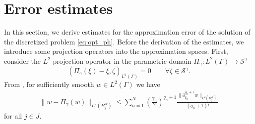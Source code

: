 \documentclass[a4paper,10pt]{article}
\numberwithin{theorem}{section}
\begin{document}


\section{Error estimates}\label{sec:error_estimates} 

In this section, we derive estimates for the approximation error of the solution of the discretized problem  \eqref{eq:opt_ph}. Before the derivation of the estimates,  we introduce some projection operators into the approximation spaces. First, consider the $L^2$-projection operator in the parametric domain  $\Pi_{\gamma}\colon L^2(\Gamma) \rightarrow \mathcal{S}^{\gamma}$  
\begin{equation}
  (\Pi_{\gamma}(\xi) - \xi, \zeta)_{L^2(\Gamma)} = 0  \qquad \forall  \zeta \in \mathcal{S}^{\gamma}.
\end{equation}
From \cite[Equation (3.6)]{IBabuska_RTempone_GEZouraris_2004a}, for sufficiently smooth $w \in L^2(\Gamma)$ we have
\begin{eqnarray}\label{est:parametric}
  \|w - \Pi_\gamma(w)\|_{L^2(B_j^N)} \leq
  \sum_{n=1}^N \left(\frac{\gamma_n}{2}\right)^{q_n+1} \frac{\|\partial_{\xi_n}^{q_n+1} w\|_{L^2(B_j^N)}}{(q_n+1)!}
\end{eqnarray}
for all $j\in J$.
\end{document}
